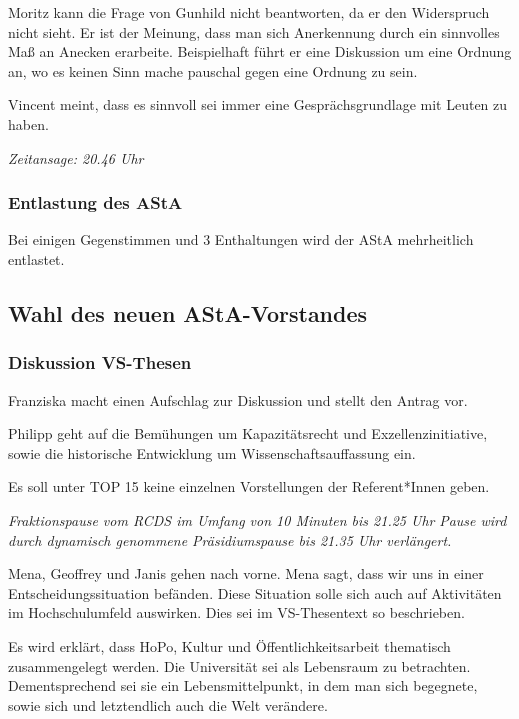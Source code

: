 \documentclass[ngerman,headheight=70pt]{scrartcl}
\begin{document}
    Moritz kann die Frage von Gunhild nicht beantworten, da er den Widerspruch
    nicht sieht. Er ist der Meinung, dass man sich Anerkennung durch ein sinnvolles
    Maß an Anecken erarbeite.
    Beispielhaft führt er eine Diskussion um eine Ordnung an, wo es keinen Sinn
    mache pauschal gegen eine Ordnung zu sein.

    Vincent meint, dass es sinnvoll sei immer eine Gesprächsgrundlage mit
    Leuten zu haben.

    \textit{Zeitansage: 20.46 Uhr}

    \subsubsection{Entlastung des AStA}

    Bei einigen Gegenstimmen und 3 Enthaltungen wird der AStA
    mehrheitlich entlastet.

    \subsection{Wahl des neuen AStA-Vorstandes}

    \subsubsection{Diskussion VS-Thesen}

    Franziska macht einen Aufschlag zur Diskussion und stellt
    den Antrag vor.

    Philipp geht auf die Bemühungen um Kapazitätsrecht und Exzellenzinitiative,
    sowie die historische Entwicklung um Wissenschaftsauffassung ein.

    Es soll unter TOP 15 keine einzelnen Vorstellungen der Referent*Innen geben.

    \textit{Fraktionspause vom RCDS im Umfang von 10 Minuten bis 21.25 Uhr}
    \textit{Pause wird durch dynamisch genommene Präsidiumspause bis 21.35 Uhr
    verlängert.}

    Mena, Geoffrey und Janis gehen nach vorne. Mena sagt, dass wir uns in einer
    Entscheidungssituation befänden. Diese Situation solle sich auch auf Aktivitäten
    im Hochschulumfeld auswirken. Dies sei im VS-Thesentext so beschrieben.

    Es wird erklärt, dass HoPo, Kultur und Öffentlichkeitsarbeit thematisch
    zusammengelegt werden. Die Universität sei als Lebensraum zu betrachten.
    Dementsprechend sei sie ein Lebensmittelpunkt, in dem man sich begegnete,
    sowie sich und letztendlich auch die Welt verändere.
\end{document}
